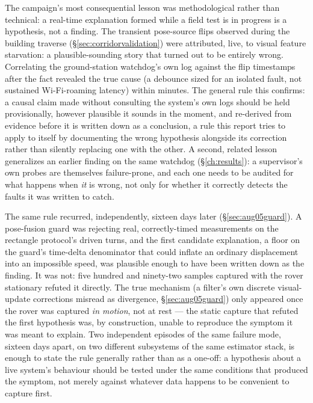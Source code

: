 The campaign's most consequential lesson was methodological rather than technical: a real-time explanation formed while a field test is in progress is a hypothesis, not a finding. The transient pose-source flips observed during the building traverse (\S\ref{sec:corridorvalidation}) were attributed, live, to visual feature starvation: a plausible-sounding story that turned out to be entirely wrong. Correlating the ground-station watchdog's own log against the flip timestamps after the fact revealed the true cause (a debounce sized for an isolated fault, not sustained Wi-Fi-roaming latency) within minutes. The general rule this confirms: a causal claim made without consulting the system's own logs should be held provisionally, however plausible it sounds in the moment, and re-derived from evidence before it is written down as a conclusion, a rule this report tries to apply to itself by documenting the wrong hypothesis alongside its correction rather than silently replacing one with the other. A second, related lesson generalizes an earlier finding on the same watchdog (\S\ref{ch:results}): a supervisor's own probes are themselves failure-prone, and each one needs to be audited for what happens when \emph{it} is wrong, not only for whether it correctly detects the faults it was written to catch.

The same rule recurred, independently, sixteen days later (\S\ref{sec:aug05guard}). A pose-fusion guard was rejecting real, correctly-timed measurements on the rectangle protocol's driven turns, and the first candidate explanation, a floor on the guard's time-delta denominator that could inflate an ordinary displacement into an impossible speed, was plausible enough to have been written down as the finding. It was not: five hundred and ninety-two samples captured with the rover stationary refuted it directly. The true mechanism (a filter's own discrete visual-update corrections misread as divergence, \S\ref{sec:aug05guard}) only appeared once the rover was captured \emph{in motion}, not at rest --- the static capture that refuted the first hypothesis was, by construction, unable to reproduce the symptom it was meant to explain. Two independent episodes of the same failure mode, sixteen days apart, on two different subsystems of the same estimator stack, is enough to state the rule generally rather than as a one-off: a hypothesis about a live system's behaviour should be tested under the same conditions that produced the symptom, not merely against whatever data happens to be convenient to capture first.

